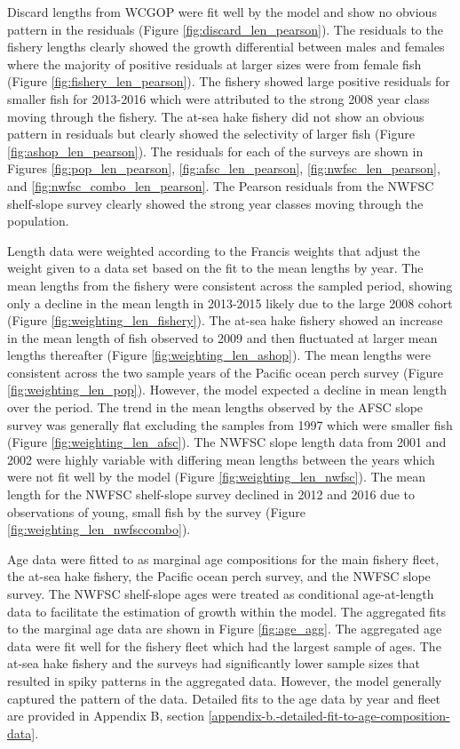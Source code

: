 \documentclass[12pt,]{article}
\begin{document}
Discard lengths from WCGOP were fit well by the model and show no
obvious pattern in the residuals (Figure \ref{fig:discard_len_pearson}).
The residuals to the fishery lengths clearly showed the growth
differential between males and females where the majority of positive
residuals at larger sizes were from female fish (Figure
\ref{fig:fishery_len_pearson}). The fishery showed large positive
residuals for smaller fish for 2013-2016 which were attributed to the
strong 2008 year class moving through the fishery. The at-sea hake
fishery did not show an obvious pattern in residuals but clearly showed
the selectivity of larger fish (Figure \ref{fig:ashop_len_pearson}). The
residuals for each of the surveys are shown in Figures
\ref{fig:pop_len_pearson}, \ref{fig:afsc_len_pearson},
\ref{fig:nwfsc_len_pearson}, and \ref{fig:nwfsc_combo_len_pearson}. The
Pearson residuals from the NWFSC shelf-slope survey clearly showed the
strong year classes moving through the population.

Length data were weighted according to the Francis weights that adjust
the weight given to a data set based on the fit to the mean lengths by
year. The mean lengths from the fishery were consistent across the
sampled period, showing only a decline in the mean length in 2013-2015
likely due to the large 2008 cohort (Figure
\ref{fig:weighting_len_fishery}). The at-sea hake fishery showed an
increase in the mean length of fish observed to 2009 and then fluctuated
at larger mean lengths thereafter (Figure
\ref{fig:weighting_len_ashop}). The mean lengths were consistent across
the two sample years of the Pacific ocean perch survey (Figure
\ref{fig:weighting_len_pop}). However, the model expected a decline in
mean length over the period. The trend in the mean lengths observed by
the AFSC slope survey was generally flat excluding the samples from 1997
which were smaller fish (Figure \ref{fig:weighting_len_afsc}). The NWFSC
slope length data from 2001 and 2002 were highly variable with differing
mean lengths between the years which were not fit well by the model
(Figure \ref{fig:weighting_len_nwfsc}). The mean length for the NWFSC
shelf-slope survey declined in 2012 and 2016 due to observations of
young, small fish by the survey (Figure
\ref{fig:weighting_len_nwfsccombo}).

Age data were fitted to as marginal age compositions for the main
fishery fleet, the at-sea hake fishery, the Pacific ocean perch survey,
and the NWFSC slope survey. The NWFSC shelf-slope ages were treated as
conditional age-at-length data to facilitate the estimation of growth
within the model. The aggregated fits to the marginal age data are shown
in Figure \ref{fig:age_agg}. The aggregated age data were fit well for
the fishery fleet which had the largest sample of ages. The at-sea hake
fishery and the surveys had significantly lower sample sizes that
resulted in spiky patterns in the aggregated data. However, the model
generally captured the pattern of the data. Detailed fits to the age
data by year and fleet are provided in Appendix B, section
\ref{appendix-b.-detailed-fit-to-age-composition-data}.
\end{document}
